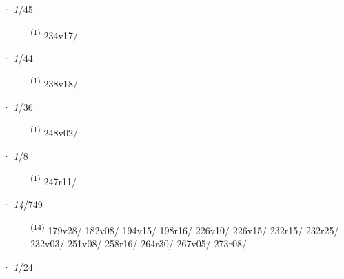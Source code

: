 \noindent{} · \textit{1}/45 \LEMMALINE
\begin{description}
    \item[]  \textsuperscript{(1)} \mbox{234v17/}
\end{description}
\ENTRYEND
\noindent{} · \textit{1}/44 \LEMMALINE
\begin{description}
    \item[]  \textsuperscript{(1)} \mbox{238v18/}
\end{description}
\ENTRYEND
\noindent{} · \textit{1}/36 \LEMMALINE
\begin{description}
    \item[]  \textsuperscript{(1)} \mbox{248v02/}
\end{description}
\ENTRYEND
\noindent{} · \textit{1}/8 \LEMMALINE
\begin{description}
    \item[]  \textsuperscript{(1)} \mbox{247r11/}
\end{description}
\ENTRYEND
\noindent{} · \textit{14}/749 \LEMMALINE
\begin{description}
    \item[]  \textsuperscript{(14)} \mbox{179v28/} \mbox{182v08/} \mbox{194v15/} \mbox{198r16/} \mbox{226v10/} \mbox{226v15/} \mbox{232r15/} \mbox{232r25/} \mbox{232v03/} \mbox{251v08/} \mbox{258r16/} \mbox{264r30/} \mbox{267v05/} \mbox{273r08/}
\end{description}
\ENTRYEND
\noindent{} · \textit{1}/24 \LEMMALINE

